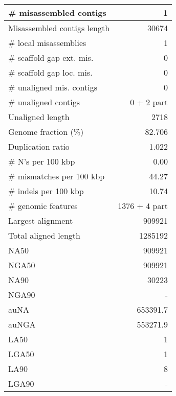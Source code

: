 \documentclass[12pt,a4paper]{article}
\begin{document}
\begin{table}[ht]
\begin{center}
\begin{tabular}{|l*{1}{|r}|}
\# misassembled contigs & 1 \\ \hline
Misassembled contigs length & 30674 \\ \hline
\# local misassemblies & 1 \\ \hline
\# scaffold gap ext. mis. & 0 \\ \hline
\# scaffold gap loc. mis. & 0 \\ \hline
\# unaligned mis. contigs & 0 \\ \hline
\# unaligned contigs & 0 + 2 part \\ \hline
Unaligned length & 2718 \\ \hline
Genome fraction (\%) & 82.706 \\ \hline
Duplication ratio & 1.022 \\ \hline
\# N's per 100 kbp & 0.00 \\ \hline
\# mismatches per 100 kbp & 44.27 \\ \hline
\# indels per 100 kbp & 10.74 \\ \hline
\# genomic features & 1376 + 4 part \\ \hline
Largest alignment & 909921 \\ \hline
Total aligned length & 1285192 \\ \hline
NA50 & 909921 \\ \hline
NGA50 & 909921 \\ \hline
NA90 & 30223 \\ \hline
NGA90 & - \\ \hline
auNA & 653391.7 \\ \hline
auNGA & 553271.9 \\ \hline
LA50 & 1 \\ \hline
LGA50 & 1 \\ \hline
LA90 & 8 \\ \hline
LGA90 & - \\ \hline
\end{tabular}
\end{center}
\end{table}
\end{document}
